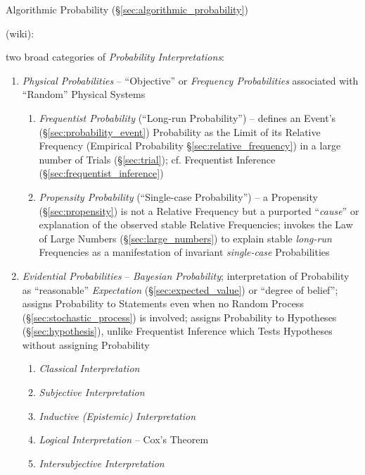 \fist Algorithmic Probability (\S\ref{sec:algorithmic_probability})

(wiki):

two broad categories of \emph{Probability Interpretations}:
\begin{enumerate}
  \item \emph{Physical Probabilities} -- ``Objective'' or \emph{Frequency
    Probabilities} associated with ``Random'' Physical Systems
    \begin{enumerate}
      \item \emph{Frequentist Probability} (``Long-run Probability'') -- defines
        an Event's (\S\ref{sec:probability_event}) Probability as the Limit of
        its Relative Frequency (Empirical Probability
        \S\ref{sec:relative_frequency}) in a large number of Trials
        (\S\ref{sec:trial}); cf. Frequentist Inference
        (\S\ref{sec:frequentist_inference})
      \item \emph{Propensity Probability} (``Single-case Probability'') -- a
        Propensity (\S\ref{sec:propensity}) is not a Relative Frequency but a
        purported ``\emph{cause}'' or explanation of the observed stable
        Relative Frequencies; invokes the Law of Large Numbers
        (\S\ref{sec:large_numbers}) to explain stable \emph{long-run}
        Frequencies as a manifestation of invariant \emph{single-case}
        Probabilities
    \end{enumerate}
  \item \emph{Evidential Probabilities} -- \emph{Bayesian Probability};
    interpretation of Probability as ``reasonable'' \emph{Expectation}
    (\S\ref{sec:expected_value}) or ``degree of belief''; assigns Probability to
    Statements even when no Random Process (\S\ref{sec:stochastic_process}) is
    involved; assigns Probability to Hypotheses (\S\ref{sec:hypothesis}), unlike
    Frequentist Inference which Tests Hypotheses without assigning Probability
    \begin{enumerate}
      \item \emph{Classical Interpretation}
      \item \emph{Subjective Interpretation}
      \item \emph{Inductive (Epistemic) Interpretation}
      \item \emph{Logical Interpretation} -- Cox's Theorem
      \item \emph{Intersubjective Interpretation}
    \end{enumerate}
\end{enumerate}

